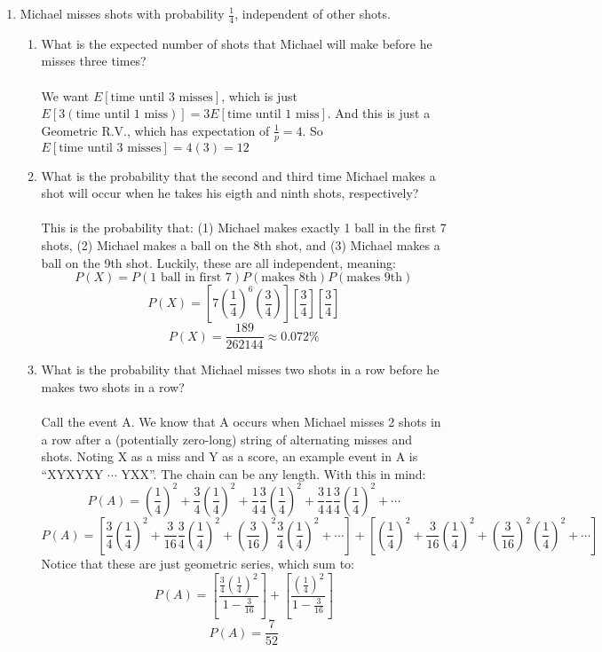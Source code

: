 \begin{enumerate}
  \item Michael misses shots with probability $\frac{1}{4}$, independent of other shots.
    \begin{enumerate}
      \item What is the expected number of shots that Michael will make before he misses three times?\\\\

        We want $E[\text{time until 3 misses}]$, which is just $E[3(\text{time until 1 miss})] = 3E[\text{time until 1 miss}]$. And this is just a Geometric R.V., which has expectation of $\frac{1}{p} = 4$. So $E[\text{time until 3 misses}] = 4(3) = 12$\\

      \item What is the probability that the second and third time Michael makes a shot will occur when he takes his eigth and ninth shots, respectively?\\\\

        This is the probability that: (1) Michael makes exactly 1 ball in the first 7 shots, (2) Michael makes a ball on the 8th shot, and (3) Michael makes a ball on the 9th shot. Luckily, these are all independent, meaning:
        $$P(X) = P(\text{1 ball in first 7})P(\text{makes 8th})P(\text{makes 9th})$$
        $$P(X) = [7(\frac{1}{4})^6(\frac{3}{4})][\frac{3}{4}][\frac{3}{4}]$$
        $$P(X) = \frac{189}{262144} \approx 0.072\%$$
      \item What is the probability that Michael misses two shots in a row before he makes two shots in a row?\\\\

        Call the event A. We know that A occurs when Michael misses 2 shots in a row after a (potentially zero-long) string of alternating misses and shots. Noting X as a miss and Y as a score, an example event in A is ``XYXYXY $\cdots$ YXX''. The chain can be any length. With this in mind:
        $$P(A) = (\frac{1}{4})^2 + \frac{3}{4}(\frac{1}{4})^2 + \frac{1}{4} \frac{3}{4}(\frac{1}{4})^2 + \frac{3}{4} \frac{1}{4} \frac{3}{4}(\frac{1}{4})^2 + \cdots$$
        $$P(A) =[\frac{3}{4}(\frac{1}{4})^2 + \frac{3}{16} \frac{3}{4}(\frac{1}{4})^2 + (\frac{3}{16})^2 \frac{3}{4}(\frac{1}{4})^2 + \cdots] + [(\frac{1}{4})^2 + \frac{3}{16}(\frac{1}{4})^2 + (\frac{3}{16})^2(\frac{1}{4})^2 + \cdots]$$
        Notice that these are just geometric series, which sum to:
        $$P(A) =[\frac{\frac{3}{4}(\frac{1}{4})^2}{1 - \frac{3}{16}}] + [\frac{(\frac{1}{4})^2}{1 - \frac{3}{16}}]$$
        $$P(A)= \frac{7}{52}$$
        

\end{enumerate}
\end{enumerate}
